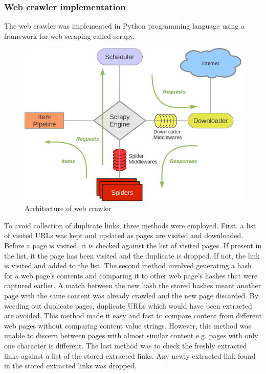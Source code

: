 \subsubsection{Web crawler implementation}
The web crawler was implemented in Python programming language using a framework for web scraping called scrapy.
\begin{figure}[H]
	\includegraphics[width=\linewidth,scale=0.1]{../static/img/scrapy.png}
	\caption{Architecture of web crawler}
\end{figure}


\noindent
To avoid collection of duplicate links, three methods were employed. First, a list of visited URLs was kept and updated as pages are visited and downloaded. Before a page is visited, it is checked against the list of visited pages. If present in the list, it the page has been visited and the duplicate is dropped. If not, the link is visited and added to the list. The second method involved generating a hash for a web page's contents and comparing it to other web page's hashes that were captured earlier. A match between the new hash the stored hashes meant another page with the same content was already crawled and the new page discarded. By weeding out duplicate pages, duplicate URLs which would have been extracted are avoided. This method made it easy and fast to compare content from different web pages without comparing content value strings. However, this method was unable to discern between pages with almost similar content e.g. pages with only one character is different. The last method was to check the freshly extracted links against a list of the stored extracted links. Any newly extracted link found in the stored extracted links was dropped.

